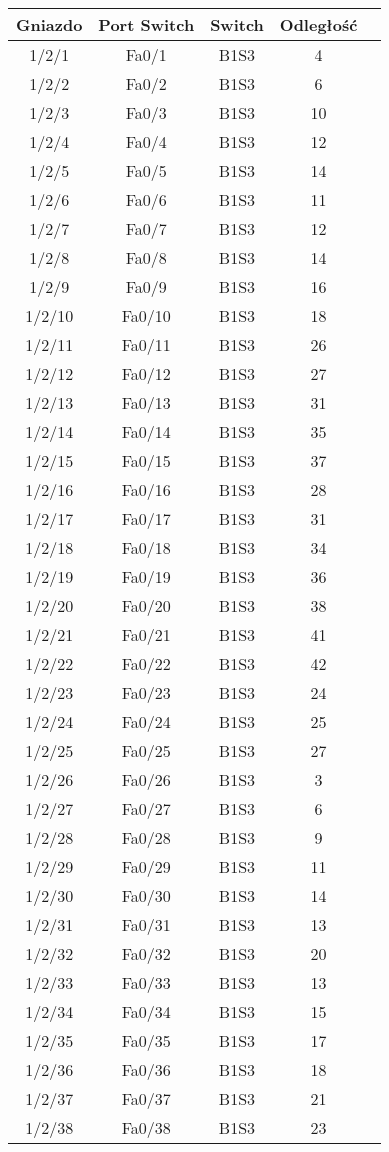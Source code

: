 \begin{center}
    \begin{longtable}{|c|c|c|c|c|}
    \hline
    Gniazdo & Port Switch & Switch & Odległość \\ \hline
	1/2/1 & Fa0/1 & B1S3 & 4 \\ \hline
	1/2/2 & Fa0/2 & B1S3 & 6 \\ \hline
	1/2/3 & Fa0/3 & B1S3 & 10 \\ \hline
	1/2/4 & Fa0/4 & B1S3 & 12 \\ \hline
	1/2/5 & Fa0/5 & B1S3 & 14 \\ \hline
	1/2/6 & Fa0/6 & B1S3 & 11 \\ \hline
	1/2/7 & Fa0/7 & B1S3 & 12 \\ \hline
	1/2/8 & Fa0/8 & B1S3 & 14 \\ \hline
	1/2/9 & Fa0/9 & B1S3 & 16 \\ \hline
	1/2/10 & Fa0/10 & B1S3 & 18 \\ \hline
	1/2/11 & Fa0/11 & B1S3 & 26 \\ \hline
	1/2/12 & Fa0/12 & B1S3 & 27 \\ \hline
	1/2/13 & Fa0/13 & B1S3 & 31 \\ \hline
	1/2/14 & Fa0/14 & B1S3 & 35 \\ \hline
	1/2/15 & Fa0/15 & B1S3 & 37 \\ \hline
	1/2/16 & Fa0/16 & B1S3 & 28 \\ \hline
	1/2/17 & Fa0/17 & B1S3 & 31 \\ \hline
	1/2/18 & Fa0/18 & B1S3 & 34 \\ \hline
	1/2/19 & Fa0/19 & B1S3 & 36 \\ \hline
	1/2/20 & Fa0/20 & B1S3 & 38 \\ \hline
	1/2/21 & Fa0/21 & B1S3 & 41 \\ \hline
	1/2/22 & Fa0/22 & B1S3 & 42 \\ \hline
	1/2/23 & Fa0/23 & B1S3 & 24 \\ \hline
	1/2/24 & Fa0/24 & B1S3 & 25 \\ \hline
	1/2/25 & Fa0/25 & B1S3 & 27 \\ \hline
	1/2/26 & Fa0/26 & B1S3 & 3 \\ \hline
	1/2/27 & Fa0/27 & B1S3 & 6 \\ \hline
	1/2/28 & Fa0/28 & B1S3 & 9 \\ \hline
	1/2/29 & Fa0/29 & B1S3 & 11 \\ \hline
	1/2/30 & Fa0/30 & B1S3 & 14 \\ \hline
	1/2/31 & Fa0/31 & B1S3 & 13 \\ \hline
	1/2/32 & Fa0/32 & B1S3 & 20 \\ \hline
	1/2/33 & Fa0/33 & B1S3 & 13 \\ \hline
	1/2/34 & Fa0/34 & B1S3 & 15 \\ \hline
	1/2/35 & Fa0/35 & B1S3 & 17 \\ \hline
	1/2/36 & Fa0/36 & B1S3 & 18 \\ \hline
	1/2/37 & Fa0/37 & B1S3 & 21 \\ \hline
	1/2/38 & Fa0/38 & B1S3 & 23 \\ \hline



\end{longtable}
\end{center}
